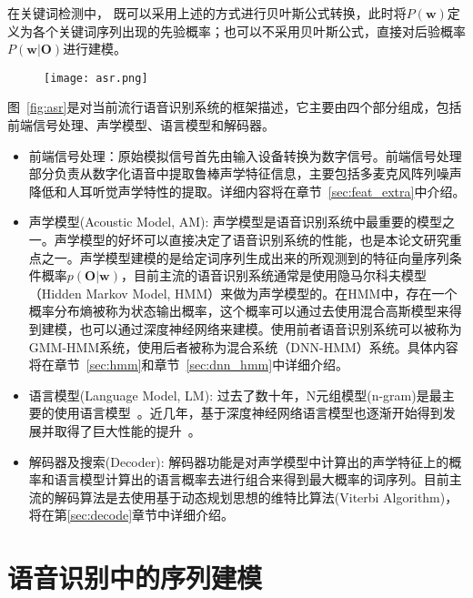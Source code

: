 在关键词检测中， 既可以采用上述的方式进行贝叶斯公式转换，此时将$P(\mathbf{w})$定义为各个关键词序列出现的先验概率；也可以不采用贝叶斯公式，直接对后验概率$P(\mathbf{w}|\mathbf{O})$进行建模。

\begin{figure}[!htp]
  \centering
    \captionstyle{\centering}
    \texttt{[image: asr.png]}
\end{figure}

图~\ref{fig:asr}是对当前流行语音识别系统的框架描述，它主要由四个部分组成，包括前端信号处理、声学模型、语言模型和解码器。
\begin{itemize}
    \item 前端信号处理：原始模拟信号首先由输入设备转换为数字信号。前端信号处理部分负责从数字化语音中提取鲁棒声学特征信息，主要包括多麦克风阵列噪声降低和人耳听觉声学特性的提取。详细内容将在章节~\ref{sec:feat_extra}中介绍。
    \item 声学模型(Acoustic Model, AM): 声学模型是语音识别系统中最重要的模型之一。声学模型的好坏可以直接决定了语音识别系统的性能，也是本论文研究重点之一。声学模型建模的是给定词序列生成出来的所观测到的特征向量序列条件概率$p(\mathbf{O}|\mathbf{w})$，目前主流的语音识别系统通常是使用隐马尔科夫模型（Hidden Markov Model, HMM）来做为声学模型的。在HMM中，存在一个概率分布熵被称为状态输出概率，这个概率可以通过去使用混合高斯模型来得到建模，也可以通过深度神经网络来建模。使用前者语音识别系统可以被称为GMM-HMM系统，使用后者被称为混合系统（DNN-HMM）系统。具体内容将在章节~\ref{sec:hmm}和章节~\ref{sec:dnn_hmm}中详细介绍。
    \item 语言模型(Language Model, LM): 过去了数十年，N元组模型(n-gram)是最主要的使用语言模型~\cite{good1953population,katz1987estimation,brown1992class}。近几年，基于深度神经网络语言模型也逐渐开始得到发展并取得了巨大性能的提升~\cite{mikolov2010recurrent,mikolov2012statistical}。
    \item 解码器及搜索(Decoder): 解码器功能是对声学模型中计算出的声学特征上的概率和语言模型计算出的语言概率去进行组合来得到最大概率的词序列。目前主流的解码算法是去使用基于动态规划思想的维特比算法(Viterbi Algorithm)，将在第\ref{sec:decode}章节中详细介绍。
\end{itemize}

\section{语音识别中的序列建模}
\label{chap:intro0-seq-model}

